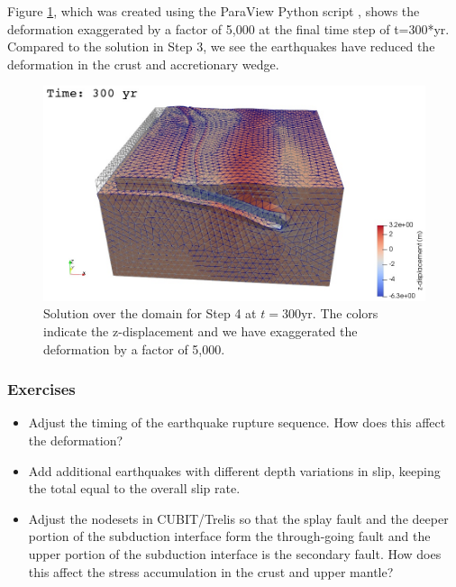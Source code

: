 Figure \ref{fig:example:subduction:3d:step04}, which was created
using the ParaView Python script , shows
the deformation exaggerated by a factor of 5,000 at the final time
step of t=300*yr. Compared to the solution in Step 3, we see the
earthquakes have reduced the deformation in the crust and accretionary
wedge.

\begin{figure}
  \includegraphics[width=5.0in]{examples/figs/subduction3d_step04_soln}
  \caption{Solution over the domain for Step 4 at $t=300 \mathrm{yr}$. The colors indicate
    the z-displacement and we have exaggerated the
    deformation by a factor of 5,000.}
  \label{fig:example:subduction:3d:step04}
\end{figure}

\subsubsection{Exercises}

\begin{itemize}
  \item Adjust the timing of the earthquake rupture sequence. How does
    this affect the deformation?
  \item Add additional earthquakes with different depth variations in
    slip, keeping the total equal to the overall slip rate.
  \item Adjust the nodesets in CUBIT/Trelis so that the splay fault
    and the deeper portion of the subduction interface form the
    through-going fault and the upper portion of the subduction
    interface is the secondary fault. How does this affect the stress
    accumulation in the crust and upper mantle?
\end{itemize}

